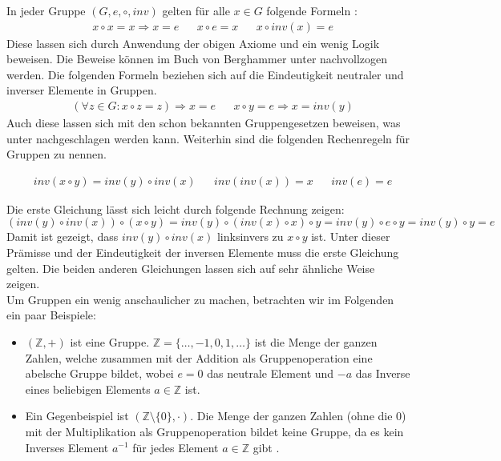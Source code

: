 In jeder Gruppe $(G,e,\circ,inv)$ gelten für alle $x \in G$ folgende Formeln \cite[S. 357-359]{Berghammer.2021}:
\begin{align*}
&x \circ x = x \Rightarrow x = e
&&x \circ e = x
&&x \circ inv(x) = e
\end{align*}
Diese lassen sich durch Anwendung der obigen Axiome und ein wenig Logik beweisen. Die Beweise können im Buch von Berghammer unter \cite[S. 358, 359]{Berghammer.2021} nachvollzogen werden. Die folgenden Formeln beziehen sich auf die Eindeutigkeit neutraler und inverser Elemente in Gruppen.
\begin{align*}
&(\forall z \in G: x \circ z = z) \Rightarrow x = e
&&x \circ y = e \Rightarrow x = inv(y)
\end{align*}
Auch diese lassen sich mit den schon bekannten Gruppengesetzen beweisen, was unter \cite[S. 358, 359]{Berghammer.2021} nachgeschlagen werden kann. Weiterhin sind die folgenden Rechenregeln für Gruppen zu nennen.

\begin{align*}
&inv(x \circ y) = inv(y) \circ inv(x)
&&inv(inv(x)) = x
&&inv(e) = e
\end{align*}

Die erste Gleichung lässt sich leicht durch folgende Rechnung zeigen:
$$(inv(y) \circ inv(x)) \circ (x \circ y) = inv(y) \circ (inv(x) \circ x) \circ y = inv(y) \circ e \circ y = inv(y) \circ y = e$$
Damit ist gezeigt, dass $inv(y) \circ inv(x)$ linksinvers zu $x \circ y$ ist. Unter dieser Prämisse und der Eindeutigkeit der inversen Elemente muss die erste Gleichung gelten. Die beiden anderen Gleichungen lassen sich auf sehr ähnliche Weise zeigen.\\

Um Gruppen ein wenig anschaulicher zu machen, betrachten wir im Folgenden ein paar Beispiele:
\begin{itemize}
\item $(\mathbb{Z}, +)$ ist eine Gruppe. $\mathbb{Z} = \{\dots, -1, 0, 1, \dots \}$ ist die Menge der ganzen Zahlen, welche zusammen mit der Addition als Gruppenoperation eine abelsche Gruppe bildet, wobei $e = 0$ das neutrale Element und $-a$ das Inverse eines beliebigen Elements $a \in \mathbb{Z}$ ist.
\item Ein Gegenbeispiel ist $(\mathbb{Z} \setminus \{0\}, \cdot)$. Die Menge der ganzen Zahlen (ohne die 0) mit der Multiplikation als Gruppenoperation bildet keine Gruppe, da es kein Inverses Element $a^{-1}$ für jedes Element $a \in \mathbb{Z}$ gibt \cite[S. 239, 240]{Paar.2016}.
\end{itemize}
